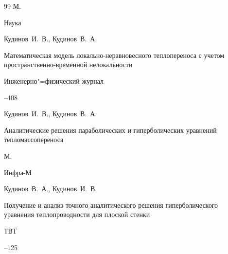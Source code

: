 \begin{thebibliography}{99}
\publaddr М.

\publ Наука






\by Кудинов~И.~В., Кудинов~В.~А.

\paper Математическая модель локально-неравновесного теплопереноса с учетом пространственно-временной нелокальности

\jour Инженерно"=физический журнал




--408





\by Кудинов~И.~В., Кудинов~В.~А.

\book Аналитические решения параболических и гиперболических уравнений тепломассопереноса

\publaddr М.

\publ Инфра-М






\by Кудинов~В.~А., Кудинов~И.~В.

\paper Получение и анализ точного аналитического решения гиперболического уравнения теплопроводности для плоской стенки

\jour ТВТ




--125











\end{thebibliography}
